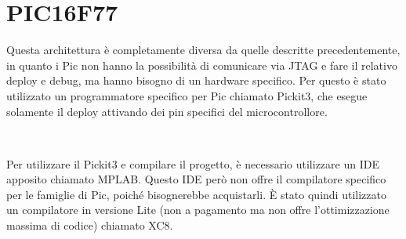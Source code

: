 \documentclass[a4paper,titlepage]{book}
\begin{document}
\section{PIC16F77}

Questa architettura è completamente diversa da quelle descritte precedentemente, in quanto i Pic non hanno la possibilità di comunicare via JTAG e fare il relativo deploy e debug, ma hanno bisogno di un hardware specifico. Per questo è stato utilizzato un programmatore specifico per Pic chiamato Pickit3, che esegue solamente il deploy attivando dei pin specifici del microcontrollore.

~

Per utilizzare il Pickit3 e compilare il progetto, è necessario utilizzare un IDE apposito chiamato MPLAB. Questo IDE però non offre il compilatore specifico per le famiglie di Pic, poiché bisognerebbe acquistarli. È stato quindi utilizzato un compilatore in versione Lite (non a pagamento ma non offre l'ottimizzazione massima di codice) chiamato XC8. 



\nocite{*}
 

\end{document}
